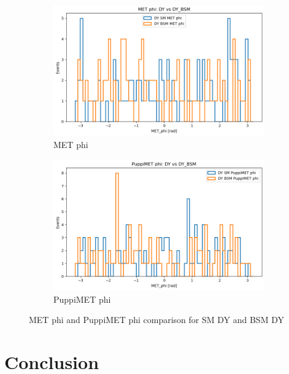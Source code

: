 \documentclass{CUP-JNL-DTM}%
\theoremstyle{definition}
\numberwithin{equation}{section}
\begin{document}
\begin{figure}[H]
    \begin{subfigure}{.5\textwidth}
      \centering
      \includegraphics[width=.85\linewidth]{img/met_phi.png}
      \caption{MET phi}
      \label{fig:sm_metphi}
    \end{subfigure}%
    \begin{subfigure}{.5\textwidth}
      \centering
      \includegraphics[width=.85\linewidth]{img/pmet_phi.png}
      \caption{PuppiMET phi}
      \label{fig:sm_pmetphi}
    \end{subfigure}
    \caption{MET phi and PuppiMET phi comparison for SM DY and BSM DY}
    \label{fig:metphi}
\end{figure}

\section{Conclusion}


\begin{Backmatter}
\begin{thebibliography}{}




\end{thebibliography}   

\end{Backmatter}
\end{document}
